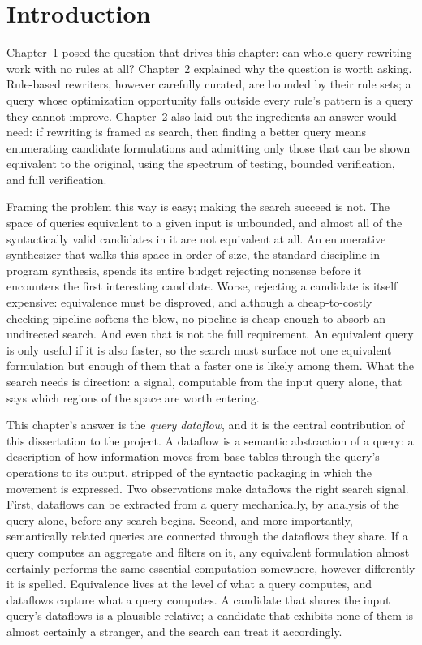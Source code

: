 \section{Introduction}
\label{slab:sec:intro}

Chapter~1 posed the question that drives this chapter: can whole-query
rewriting work with no rules at all? Chapter~2 explained why the
question is worth asking. Rule-based rewriters, however carefully
curated, are bounded by their rule sets; a query whose optimization
opportunity falls outside every rule's pattern is a query they cannot
improve. Chapter~2 also laid out the ingredients an answer would need:
if rewriting is framed as search, then finding a better query means
enumerating candidate formulations and admitting only those that can
be shown equivalent to the original, using the spectrum of testing,
bounded verification, and full verification.

Framing the problem this way is easy; making the search succeed is
not. The space of queries equivalent to a given input is unbounded,
and almost all of the syntactically valid candidates in it are not
equivalent at all. An enumerative synthesizer that walks this space in
order of size, the standard discipline in program synthesis, spends
its entire budget rejecting nonsense before it encounters the first
interesting candidate. Worse, rejecting a candidate is itself
expensive: equivalence must be disproved, and although a
cheap-to-costly checking pipeline softens the blow, no pipeline is
cheap enough to absorb an undirected search. And even that is not the
full requirement. An equivalent query is only useful if it is also
faster, so the search must surface not one equivalent formulation but
enough of them that a faster one is likely among them. What the search
needs is direction: a signal, computable from the input query alone,
that says which regions of the space are worth entering.

This chapter's answer is the \emph{query dataflow}, and it is the
central contribution of this dissertation to the \slabcity project. A
dataflow is a semantic abstraction of a query: a description of how
information moves from base tables through the query's operations to
its output, stripped of the syntactic packaging in which the movement
is expressed. Two observations make dataflows the right search signal.
First, dataflows can be extracted from a query mechanically, by
analysis of the query alone, before any search begins. Second, and
more importantly, semantically related queries are connected through
the dataflows they share. If a query computes an aggregate and filters
on it, any equivalent formulation almost certainly performs the same
essential computation somewhere, however differently it is spelled.
Equivalence lives at the level of what a query computes, and dataflows
capture what a query computes. A candidate that shares the input
query's dataflows is a plausible relative; a candidate that exhibits
none of them is almost certainly a stranger, and the search can treat
it accordingly.

